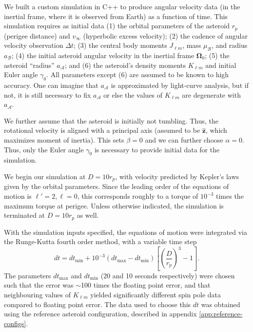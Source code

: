 \documentclass[fleqn,usenatbib]{mnras}
\newcommand{\unit}[1]{\bm{\hat{#1}}}
\newcommand{\parens}[1]{\left( #1 \right)}
\newcommand{\brackets}[1]{\left[ #1 \right]}
\begin{document}
We built a custom simulation in C++ to produce angular velocity data (in the inertial frame, where it is observed from Earth) as a function of time. This simulation requires as initial data (1) the orbital parameters of the asteroid $r_p$ (perigee distance) and $v_\infty$ (hyperbolic excess velocity); (2) the cadence of angular velocity observation $\Delta t$; (3) the central body moments $J_{\ell m}$, mass $\mu_\mathcal{B}$, and radius $a_\mathcal{B}$; (4) the initial asteroid angular velocity in the inertial frame $\bm \Omega_0$; (5) the asteroid ``radius'' $a_\mathcal{A}$; and (6) the asteroid's density moments $K_{\ell m}$ and initial Euler angle $\gamma_0$. All parameters except (6) are assumed to be known to high accuracy. One can imagine that $a_\mathcal{A}$ is approximated by light-curve analysis, but if not, it is still necessary to fix $a_\mathcal{A}$ or else the values of $K_{\ell m}$ are degenerate with $a_\mathcal{A}$.

We further assume that the asteroid is initially not tumbling. Thus, the rotational velocity is aligned with a principal axis (assumed to be $\unit z$, which maximizes moment of inertia). This sets $\beta = 0$ and we can further choose $\alpha = 0$. Thus, only the Euler angle $\gamma_0$ is necessary to provide initial data for the simulation.

We begin our simulation at $D = 10 r_p$, with velocity predicted by Kepler's laws given by the orbital parameters. Since the leading order of the equations of motion is $\ell' = 2, \ell = 0$, this corresponds roughly to a torque of $10^{-3}$ times the maximum torque at perigee. Unless otherwise indicated, the simulation is terminated at $D=10 r_p$ as well.

With the simulation inputs specified, the equations of motion were integrated via the Runge-Kutta fourth order method, with a variable time step
\begin{equation}
  dt = dt_\text{min} + 10^{-3}(dt_\text{max} - dt_\text{min}) \brackets{\parens{\frac{D}{r_p}}^3 - 1}.
\end{equation}
The parameters $dt_\text{max}$ and $dt_\text{min}$ (20 and 10 seconds respectively) were chosen such that the error was $\sim$100 times the floating point error, and that neighbouring values of $K_{\ell m}$ yielded significantly different spin pole data compared to floating point error. The data used to choose this $dt$ was obtained using the reference asteroid configuration, described in appendix \ref{app:reference-configs}.
\end{document}
